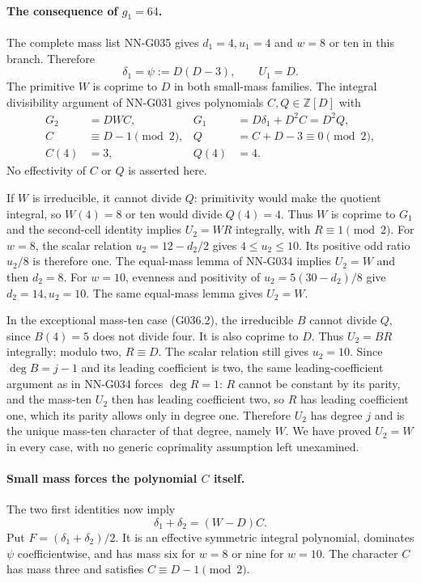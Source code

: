 \paragraph{The consequence of $g_1=64$.}
The complete mass list NN-G035 gives
$d_1=4,u_1=4$ and $w=8$ or ten in this branch.
Therefore
\[
                 \delta_1=\psi:=D(D-3),\qquad U_1=D.
\]
The primitive $W$ is coprime to $D$ in both small-mass
families. The integral divisibility argument of
NN-G031 gives polynomials $C,Q\in\mathbb Z[D]$ with
\[
 \begin{aligned}
 G_2&=DWC,&G_1&=D\delta_1+D^2C=D^2Q,\\
 C&\equiv D-1\pmod2,&Q&=C+D-3\equiv0\pmod2,\\
 C(4)&=3,&Q(4)&=4.
 \end{aligned}                                                       \tag{G036.3}
\]
No effectivity of $C$ or $Q$ is asserted here.

If $W$ is irreducible, it cannot divide $Q$:
primitivity would make the quotient integral,
so $W(4)=8$ or ten would divide $Q(4)=4$.
Thus $W$ is coprime to $G_1$ and the second-cell
identity implies $U_2=WR$ integrally, with
$R\equiv1\pmod2$.
For $w=8$, the scalar relation
$u_2=12-d_2/2$ gives $4\le u_2\le10$.
Its positive odd ratio $u_2/8$ is therefore one.
The equal-mass lemma of NN-G034 implies $U_2=W$
and then $d_2=8$.
For $w=10$, evenness and positivity of
$u_2=5(30-d_2)/8$ give $d_2=14,u_2=10$.
The same equal-mass lemma gives $U_2=W$.

In the exceptional mass-ten case (G036.2), the
irreducible $B$ cannot divide $Q$, since $B(4)=5$
does not divide four. It is also coprime to $D$.
Thus $U_2=BR$ integrally; modulo two, $R\equiv D$.
The scalar relation still gives $u_2=10$.
Since $\deg B=j-1$ and its leading coefficient is
two, the same leading-coefficient argument as in
NN-G034 forces $\deg R=1$: $R$ cannot be constant
by its parity, and the mass-ten $U_2$ then has
leading coefficient two, so $R$ has leading
coefficient one, which its parity allows only
in degree one.
Therefore $U_2$ has degree $j$ and is the unique
mass-ten character of that degree, namely $W$.
We have proved $U_2=W$ in every case, with no
generic coprimality assumption left unexamined.

\paragraph{Small mass forces the polynomial $C$ itself.}
The two first identities now imply
\[
 \delta_1+\delta_2=(W-D)C.
\]
Put $F=(\delta_1+\delta_2)/2$.
It is an effective symmetric integral polynomial,
dominates $\psi$ coefficientwise, and has mass
six for $w=8$ or nine for $w=10$.
The character $C$ has mass three and satisfies
$C\equiv D-1\pmod2$.

